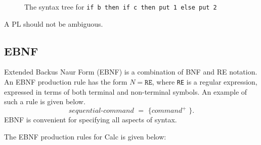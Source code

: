 \documentclass[a4paper, openany]{memoir}
\begin{document}
\begin{figure}[H]
    \centering
    \caption{The syntax tree for \texttt{if b then if c then put 1 else put 2}}
\end{figure}
\noindent A PL should not be ambiguous.

\subsection{EBNF}
Extended Backus Naur Form (EBNF) is a combination of BNF and RE notation. An EBNF production rule has the form $N = \texttt{RE}$, where \texttt{RE} is a regular expression, expressed in terms of both terminal and non-terminal symbols. An example of such a rule is given below.
\[\textit{sequential-command } = \texttt{ \{ } \textit{command}^{\texttt{+}} \texttt{ \}}.\]
EBNF is convenient for specifying all aspects of syntax.

The EBNF production rules for Calc is given below:
\end{document}
